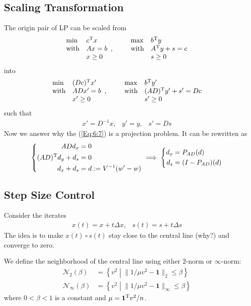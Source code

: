 \subsection{Scaling Transformation}
The origin pair of LP can be scaled from
\[
\begin{array}{ll}
\min&c^{\mathrm T} x\\
\mbox{with}&Ax=b\\
&x\ge0
\end{array},\qquad
\begin{array}{ll}
\max&b^{\mathrm T} y\\
\mbox{with}&A^{\mathrm T} y+s=c\\
&s\ge0
\end{array}
\]
into
\[
\begin{array}{ll}
\min&(Dc)^{\mathrm T} x'\\
\mbox{with}&ADx'=b\\
&x'\ge0
\end{array},
\qquad
\begin{array}{ll}
\max&b^{\mathrm T} y'\\
\mbox{with}&(AD)^{\mathrm T} y'+s'=Dc\\
&s'\ge0
\end{array}
\]
such that
\[
\begin{array}{lll}
x'=D^{-1}x,
&
y'=y,
&
s'=Ds
\end{array}
\]
Now we answer why the (\ref{Eq:6:7}) is a projection problem. It can be rewritten as
\[
\left\{
\begin{aligned}
ADd_x&=0\\
(AD)^{\mathrm T} d_y+d_s &= 0\\
d_x+d_s&=d:=V^{-1}(w'-w)
\end{aligned}
\right.
\implies
\left\{
\begin{aligned}
d_x&=P_{AD}(d)\\
d_s &= (I - P_{AD})(d)
\end{aligned}
\right.
\]

\subsection{Step Size Control}
Consider the iterates
\[
\begin{array}{ll}
x(t) = x+t\Delta x,
&
s(t)=s+t\Delta s
\end{array}
\]
The idea is to make $x(t)\circ s(t)$ stay close to the central line (why?) and converge to zero.

\begin{definition}
We define the neighborhood of the central line using either $2$-norm or $\infty$-norm:
\begin{align*}
\mathcal{N}_2(\beta)&=\left\{v^2\middle|\|1/\mu v^2 - \bm 1\|_2\le\beta\right\}\\
\mathcal{N}_\infty(\beta)&=\left\{v^2\middle|\|1/\mu v^2 - \bm 1\|_\infty\le\beta\right\}
\end{align*}
where $0<\beta<1$ is a constant and $\mu = \bm 1^{\mathrm T} v^2/n$.
\end{definition}

